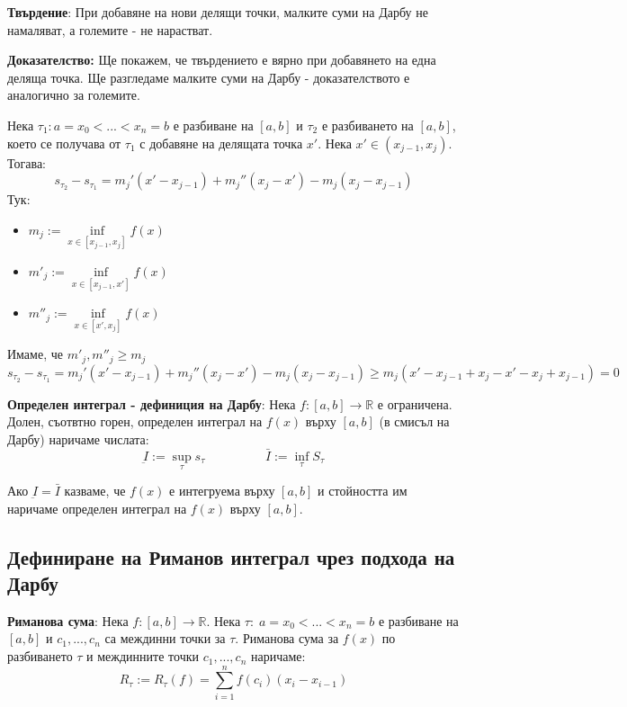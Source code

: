 \documentclass{article}
\renewcommand{\\}{\newline}
\newcommand{\doc}{\textbf{Доказателство: }}
\begin{document}
\textbf{Твърдение}: При добавяне на нови делящи точки, малките суми на Дарбу не намаляват, а големите - не нарастват.

\doc Ще покажем, че твърдението е вярно при добавянето на една деляща точка. Ще разгледаме малките суми на Дарбу - доказателството е аналогично за големите. 

Нека \(\tau_1: a = x_0 < ... < x_n = b\) е разбиване на \([a, b]\) и \(\tau_{2}\) е разбиването на \([a, b]\), което се получава от \(\tau_1\) с добавяне на делящата точка \(x'\). Нека \(x' \in (x_{j-1}, x_{j})\). Тогава: \[
  s_{\tau_{2}} - s_{\tau_{1}} = m_{j}'(x' - x_{j-1}) + m_{j}''(x_{j} - x') - m_{j}(x_{j} - x_{j-1})
\]      
Тук: \begin{itemize}
  \item \(m_{j} := \underset{x \in [x_{j-1}, x_{j}]}{\inf}f(x)\)  
  \item \(m'_{j} := \underset{x \in [x_{j-1}, x']}{\inf}f(x)\)  
  \item \(m''_{j} := \underset{x \in [x',x_{j}]}{\inf}f(x)\)  
\end{itemize}

Имаме, че \(m'_{j}, m''_{j} \geq m_{j}\)  
\[
  s_{\tau_{2}} - s_{\tau_{1}} = m_{j}'(x' - x_{j-1}) + m_{j}''(x_{j} - x') - m_{j}(x_{j} - x_{j-1})\geq m_{j}(x' - x_{j-1} + x_{j} - x' - x_{j} + x_{j-1}) = 0
\] 

\textbf{Определен интеграл - дефиниция на Дарбу}: Нека \(f:[a, b] \to \mathbb{R}\) е ограничена. Долен, съотвтно горен, определен интеграл на \(f(x)\) върху \([a,b]\) (в смисъл на Дарбу) наричаме числата: \[
  \underbar{I} := \underset{\tau}{\sup}s_{\tau} \hspace{2cm} \bar{I} := \underset{\tau}{\inf}S_{\tau}
\]    

Ако \(\underbar{I} = \bar{I}\) казваме, че \(f(x)\) е интегруема върху \([a, b]\) и стойността им наричаме определен интеграл на \(f(x)\) върху \([a, b]\). 

\subsection{Дефиниране на Риманов интеграл чрез подхода на Дарбу}

\textbf{Риманова сума}: Нека \(f: [a, b] \to \mathbb{R}\). Нека \(\tau: \; a = x_0 < ... < x_n = b\) е разбиване на \([a, b]\) и \(c_1, ..., c_n\) са междинни точки за \(\tau\). Риманова сума за \(f(x)\) по разбиването \(\tau\) и междинните точки \(c_1, ..., c_n\) наричаме: \[
  R_{\tau} := R_{\tau}(f) = \sum_{i=1}^{n}f(c_{i})(x_{i} - x_{i-1})
\]         
\end{document}
